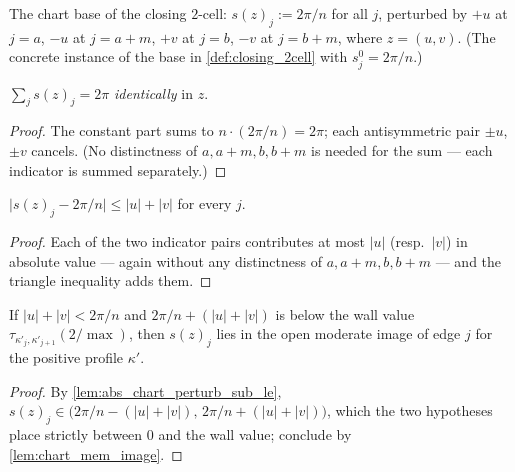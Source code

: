 \begin{definition}
  \label{def:chart_perturb}
  The chart base of the closing $2$-cell: $s(z)_j := 2\pi/n$ for all $j$,
  perturbed by $+u$ at $j=a$, $-u$ at $j=a+m$, $+v$ at $j=b$, $-v$ at $j=b+m$,
  where $z = (u,v)$. (The concrete instance of the base in
  \cref{def:closing_2cell} with $s^0_j = 2\pi/n$.)
\end{definition}

\begin{lemma}
  \label{lem:sum_chart_perturb}
  $\sum_j s(z)_j = 2\pi$ \emph{identically} in $z$.
\end{lemma}
\begin{proof}

\leanok
  The constant part sums to $n \cdot (2\pi/n) = 2\pi$; each antisymmetric pair
  $\pm u$, $\pm v$ cancels. (No distinctness of $a, a+m, b, b+m$ is needed for
  the sum --- each indicator is summed separately.)
\end{proof}

\begin{lemma}

  \label{lem:abs_chart_perturb_sub_le}
  $\bigl|s(z)_j - 2\pi/n\bigr| \le |u| + |v|$ for every $j$.
\end{lemma}
\begin{proof}

\leanok
  Each of the two indicator pairs contributes at most $|u|$ (resp.\ $|v|$) in
  absolute value --- again without any distinctness of $a, a+m, b, b+m$ ---
  and the triangle inequality adds them.
\end{proof}

\begin{lemma}

  \label{lem:chart_perturb_mem_image}
  If $|u| + |v| < 2\pi/n$ and $2\pi/n + (|u|+|v|)$ is below the wall value
  $\tau_{\kappa'_j, \kappa'_{j+1}}(2/\max)$, then $s(z)_j$ lies in the open
  moderate image of edge $j$ for the positive profile $\kappa'$.
\end{lemma}
\begin{proof}

\leanok
  By \cref{lem:abs_chart_perturb_sub_le}, $s(z)_j \in
  \bigl(2\pi/n - (|u|+|v|),\, 2\pi/n + (|u|+|v|)\bigr)$, which the two
  hypotheses place strictly between $0$ and the wall value; conclude by
  \cref{lem:chart_mem_image}.
\end{proof}

